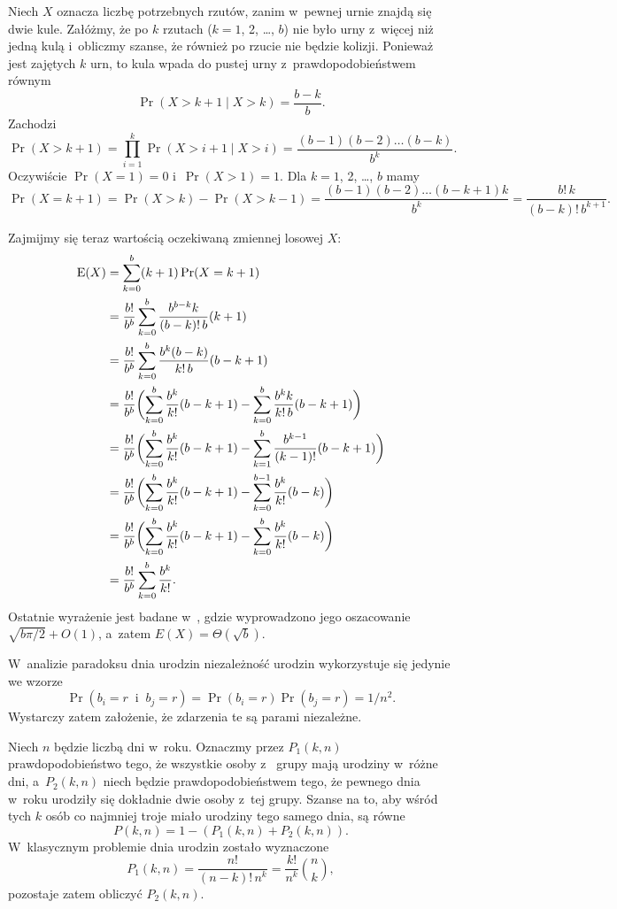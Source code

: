 \exercise %
Niech $X$ oznacza liczbę potrzebnych rzutów, zanim w~pewnej urnie znajdą się dwie kule.
Załóżmy, że po $k$ rzutach ($k=1$, 2, \dots, $b$) nie było urny z~więcej niż jedną kulą i~obliczmy szanse, że również po  rzucie nie będzie kolizji.
Ponieważ jest zajętych $k$ urn, to  kula wpada do pustej urny z~prawdopodobieństwem równym
\[
	\Pr(X>k+1\mid X>k) = \frac{b-k}{b}.
\]
Zachodzi
\[
	\Pr(X>k+1) = \prod_{i=1}^k\Pr(X>i+1\mid X>i) = \frac{(b-1)(b-2)\dots(b-k)}{b^k}.
\]
Oczywiście $\Pr(X=1)=0$ i~$\Pr(X>1)=1$.
Dla $k=1$, 2, \dots, $b$ mamy
\[
	\Pr(X=k+1) = \Pr(X>k)-\Pr(X>k-1) = \frac{(b-1)(b-2)\dots(b-k+1)k}{b^k} = \frac{b!\,k}{(b-k)!\,b^{k+1}}.
\]

Zajmijmy się teraz wartością oczekiwaną zmiennej losowej $X$:
\begin{align*}
	\operatorname{E}(X) &= \sum_{k=0}^b(k+1)\Pr(X=k+1) \\
	&= \frac{b!}{b^b}\sum_{k=0}^b\frac{b^{b-k}k}{(b-k)!\,b}(k+1) \\
	&= \frac{b!}{b^b}\sum_{k=0}^b\frac{b^k(b-k)}{k!\,b}(b-k+1) \\
	&= \frac{b!}{b^b}\biggl(\sum_{k=0}^b\frac{b^k}{k!}(b-k+1)-\sum_{k=0}^b\frac{b^kk}{k!\,b}(b-k+1)\biggr) \\
	&= \frac{b!}{b^b}\biggl(\sum_{k=0}^b\frac{b^k}{k!}(b-k+1)-\sum_{k=1}^b\frac{b^{k-1}}{(k-1)!}(b-k+1)\biggr) \\
	&= \frac{b!}{b^b}\biggl(\sum_{k=0}^b\frac{b^k}{k!}(b-k+1)-\sum_{k=0}^{b-1}\frac{b^k}{k!}(b-k)\biggr) \\
	&= \frac{b!}{b^b}\biggl(\sum_{k=0}^b\frac{b^k}{k!}(b-k+1)-\sum_{k=0}^b\frac{b^k}{k!}(b-k)\biggr) \\
	&= \frac{b!}{b^b}\sum_{k=0}^b\frac{b^k}{k!}.
\end{align*}
Ostatnie wyrażenie jest badane w~\cite{taocp1frag}, gdzie wyprowadzono jego oszacowanie $\sqrt{b\pi/2}+O(1)$, a~zatem $E(X)=\Theta(\!\sqrt{b})$.

\exercise %
W~analizie paradoksu dnia urodzin niezależność urodzin wykorzystuje się jedynie we wzorze
\[
    \Pr(b_i=r\;\;\text{i}\;\;b_j=r) = \Pr(b_i=r)\Pr(b_j=r) = 1/n^2.
\]
Wystarczy zatem założenie, że zdarzenia te są parami niezależne.

\exercise %
Niech $n$ będzie liczbą dni w~roku.
Oznaczmy przez $P_1(k,n)$ prawdopodobieństwo tego, że wszystkie osoby z~ grupy mają urodziny w~różne dni, a~$P_2(k,n)$ niech będzie prawdopodobieństwem tego, że pewnego dnia w~roku urodziły się dokładnie dwie osoby z~tej grupy.
Szanse na to, aby wśród tych $k$ osób co najmniej troje miało urodziny tego samego dnia, są równe
\[
	P(k,n) = 1-(P_1(k,n)+P_2(k,n)).
\]
W~klasycznym problemie dnia urodzin zostało wyznaczone
\[
	P_1(k,n) = \frac{n!}{(n-k)!\,n^k} = \frac{k!}{n^k}\binom{n}{k},
\]
pozostaje zatem obliczyć $P_2(k,n)$.

